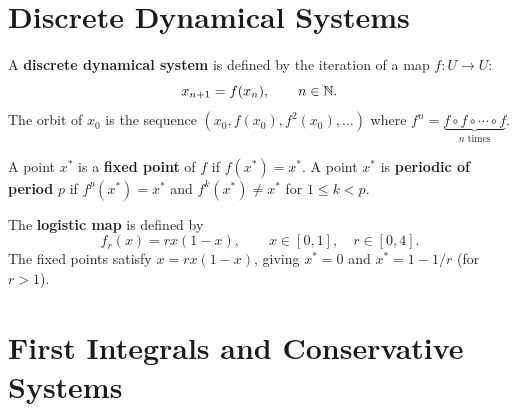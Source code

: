 \begin{center}
\end{center}

\section{Discrete Dynamical Systems}

\begin{definition}
A \textbf{discrete dynamical system} is defined by the iteration of a map
$f : U \to U$:
\[
    x_{n+1} = f(x_n), \qquad n \in \mathbb{N}.
\]
The orbit of $x_0$ is the sequence $(x_0, f(x_0), f^2(x_0), \ldots)$
where $f^n = \underbrace{f \circ f \circ \cdots \circ f}_{n \text{ times}}$.
\end{definition}

\begin{definition}
A point $x^*$ is a \textbf{fixed point} of $f$ if $f(x^*) = x^*$.
A point $x^*$ is \textbf{periodic of period} $p$ if $f^p(x^*) = x^*$
and $f^k(x^*) \neq x^*$ for $1 \leq k < p$.
\end{definition}

\begin{example}
The \textbf{logistic map} is defined by
\[
    f_r(x) = rx(1-x), \qquad x \in [0,1], \quad r \in [0,4].
\]
The fixed points satisfy $x = rx(1-x)$, giving $x^* = 0$ and
$x^* = 1 - 1/r$ (for $r > 1$).
\end{example}

\section{First Integrals and Conservative Systems}

